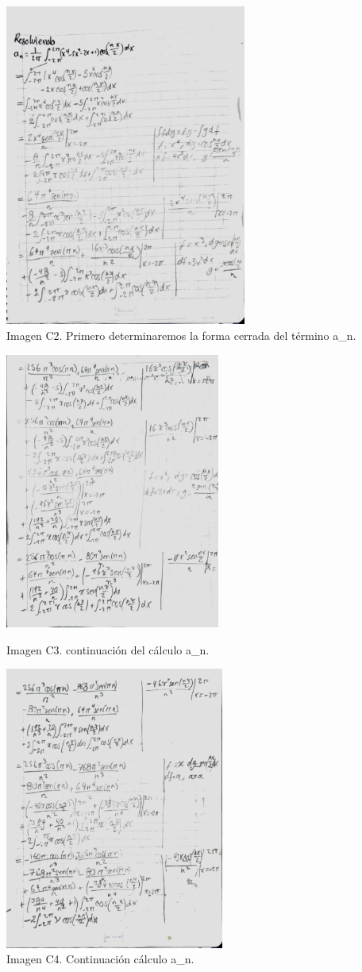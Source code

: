 \includegraphics[width=3.12761in,height=4.17188in]{media/image31.jpg}\\ Imagen C2. Primero determinaremos la forma cerrada del término a\_n.

\includegraphics[width=2.78659in,height=3.57813in]{media/image34.jpg}

Imagen C3. continuación del cálculo a\_n.

\includegraphics[width=2.84046in,height=3.66146in]{media/image14.jpg}\\ Imagen C4. Continuación cálculo a\_n.

